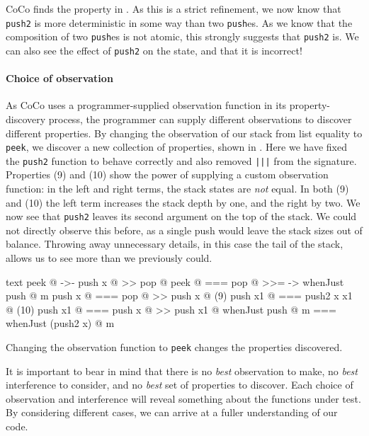 CoCo finds the property in .  As this is a strict
refinement, we now know that \verb|push2| is more deterministic in
some way than two \verb|push|es.  As we know that the composition of
two \verb|push|es is not atomic, this strongly suggests that
\verb|push2| is.  We can also see the effect of \verb|push2| on the
state, and that it is incorrect!

\paragraph{Choice of observation}
As CoCo uses a programmer-supplied observation function in its
property-discovery process, the programmer can supply different
observations to discover different properties.  By changing the
observation of our stack from list equality to \verb|peek|, we
discover a new collection of properties, shown in
.  Here we have fixed the \verb|push2| function
to behave correctly and also removed \verb#|||# from the signature.
Properties (9) and (10) show the power of supplying a custom
observation function: in the left and right terms, the stack states
are \emph{not} equal.  In both (9) and (10) the left term increases
the stack depth by one, and the right by two.  We now see that
\verb|push2| leaves its second argument on the top of the stack.  We
could not directly observe this before, as a single push would leave
the stack sizes out of balance.  Throwing away unnecessary details, in
this case the tail of the stack, allows us to see more than we
previously could.

\begin{listing}
\centering
\begin{cminted}{text}
           peek @  ->-  push x @ >> pop @
           peek @  ===  pop @ >>= \m -> whenJust push @ m
         push x @  ===  pop @ >> push x @
(9)     push x1 @  ===  push2 x x1 @
(10)    push x1 @  ===  push x @ >> push x1 @
whenJust push @ m  ===  whenJust (push2 x) @ m
\end{cminted}
\caption[Changing the obervation function changes the properties discovered.]{Changing the observation function to \texttt{peek} changes the properties discovered.}\label{lst:lockstack4}
\end{listing}

It is important to bear in mind that there is no \emph{best}
observation to make, no \emph{best} interference to consider, and no
\emph{best} set of properties to discover.  Each choice of observation
and interference will reveal something about the functions under test.
By considering different cases, we can arrive at a fuller
understanding of our code.

